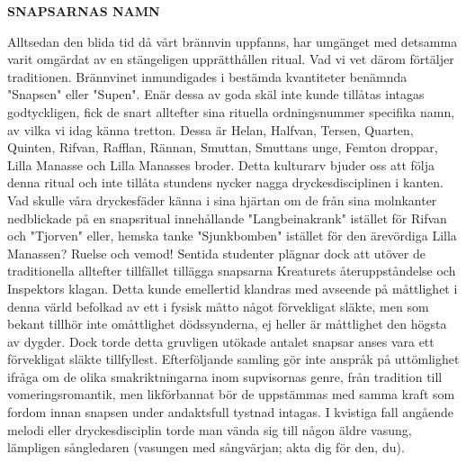 \begin{intersong}

\textbf{SNAPSARNAS NAMN}

\begin{small}
Alltsedan den blida tid då vårt brännvin uppfanns, har umgänget med detsamma varit omgärdat av en stängeligen upprätthållen ritual. Vad vi vet därom förtäljer traditionen. Brännvinet inmundigades i bestämda kvantiteter benämnda "Snapsen" eller "Supen". Enär dessa av goda skäl inte kunde tillåtas intagas godtyckligen, fick de snart alltefter sina rituella ordningsnummer specifika namn, av vilka vi idag känna tretton. Dessa är Helan, Halfvan, Tersen, Quarten, Quinten, Rifvan, Rafflan, Rännan, Smuttan, Smuttans unge, Femton droppar, Lilla Manasse och Lilla Manasses broder. Detta kulturarv bjuder oss att följa denna ritual och inte tillåta stundens nycker nagga dryckesdisciplinen i kanten. Vad skulle våra dryckesfäder känna i sina hjärtan om de från sina molnkanter nedblickade på en snapsritual innehållande "Langbeinakrank" istället för Rifvan och "Tjorven" eller, hemska tanke "Sjunkbomben" istället för den ärevördiga Lilla Manassen? Ruelse och vemod! Sentida studenter plägnar dock att utöver de traditionella alltefter tillfället tillägga snapsarna Kreaturets återuppståndelse och Inspektors klagan. Detta kunde emellertid klandras med avseende på måttlighet i denna värld befolkad av ett i fysisk måtto något förvekligat släkte, men som bekant tillhör inte omåttlighet dödssynderna, ej heller är måttlighet den högsta av dygder. Dock torde detta gruvligen utökade antalet snapsar anses vara ett förvekligat släkte tillfyllest. Efterföljande samling gör inte anspråk på uttömlighet ifråga om de olika smakriktningarna inom supvisornas genre, från tradition till vomeringsromantik, men likförbannat bör de uppstämmas med samma kraft som fordom innan snapsen under andaktsfull tystnad intagas. I kvistiga fall angående melodi eller dryckesdisciplin torde man vända sig till någon äldre vasung, lämpligen sångledaren (vasungen med sångvärjan; akta dig för den, du).
\end{small}

\end{intersong}

